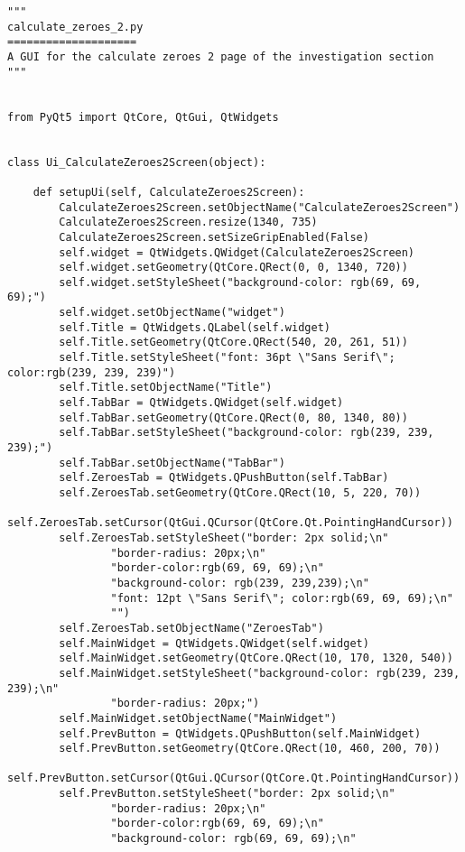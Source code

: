 \documentclass{article}
\begin{document}
\begin{lstlisting}
"""
calculate_zeroes_2.py
====================
A GUI for the calculate zeroes 2 page of the investigation section
"""


from PyQt5 import QtCore, QtGui, QtWidgets


class Ui_CalculateZeroes2Screen(object):

    def setupUi(self, CalculateZeroes2Screen):
        CalculateZeroes2Screen.setObjectName("CalculateZeroes2Screen")
        CalculateZeroes2Screen.resize(1340, 735)
        CalculateZeroes2Screen.setSizeGripEnabled(False)
        self.widget = QtWidgets.QWidget(CalculateZeroes2Screen)
        self.widget.setGeometry(QtCore.QRect(0, 0, 1340, 720))
        self.widget.setStyleSheet("background-color: rgb(69, 69, 69);")
        self.widget.setObjectName("widget")
        self.Title = QtWidgets.QLabel(self.widget)
        self.Title.setGeometry(QtCore.QRect(540, 20, 261, 51))
        self.Title.setStyleSheet("font: 36pt \"Sans Serif\"; color:rgb(239, 239, 239)")
        self.Title.setObjectName("Title")
        self.TabBar = QtWidgets.QWidget(self.widget)
        self.TabBar.setGeometry(QtCore.QRect(0, 80, 1340, 80))
        self.TabBar.setStyleSheet("background-color: rgb(239, 239, 239);")
        self.TabBar.setObjectName("TabBar")
        self.ZeroesTab = QtWidgets.QPushButton(self.TabBar)
        self.ZeroesTab.setGeometry(QtCore.QRect(10, 5, 220, 70))
        self.ZeroesTab.setCursor(QtGui.QCursor(QtCore.Qt.PointingHandCursor))
        self.ZeroesTab.setStyleSheet("border: 2px solid;\n"
                "border-radius: 20px;\n"
                "border-color:rgb(69, 69, 69);\n"
                "background-color: rgb(239, 239,239);\n"
                "font: 12pt \"Sans Serif\"; color:rgb(69, 69, 69);\n"
                "")
        self.ZeroesTab.setObjectName("ZeroesTab")
        self.MainWidget = QtWidgets.QWidget(self.widget)
        self.MainWidget.setGeometry(QtCore.QRect(10, 170, 1320, 540))
        self.MainWidget.setStyleSheet("background-color: rgb(239, 239, 239);\n"
                "border-radius: 20px;")
        self.MainWidget.setObjectName("MainWidget")
        self.PrevButton = QtWidgets.QPushButton(self.MainWidget)
        self.PrevButton.setGeometry(QtCore.QRect(10, 460, 200, 70))
        self.PrevButton.setCursor(QtGui.QCursor(QtCore.Qt.PointingHandCursor))
        self.PrevButton.setStyleSheet("border: 2px solid;\n"
                "border-radius: 20px;\n"
                "border-color:rgb(69, 69, 69);\n"
                "background-color: rgb(69, 69, 69);\n"

\end{lstlisting}
\end{document}
